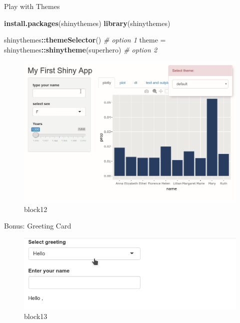 \documentclass[
  ignorenonframetext,
]{beamer}
\newenvironment{Shaded}{\begin{snugshade}}{\end{snugshade}}
\newcommand{\CommentTok}[1]{\textcolor[rgb]{0.56,0.35,0.01}{\textit{#1}}}
\newcommand{\KeywordTok}[1]{\textcolor[rgb]{0.13,0.29,0.53}{\textbf{#1}}}
\newcommand{\NormalTok}[1]{#1}
\newcommand{\OperatorTok}[1]{\textcolor[rgb]{0.81,0.36,0.00}{\textbf{#1}}}
\newcommand{\StringTok}[1]{\textcolor[rgb]{0.31,0.60,0.02}{#1}}
\begin{document}
\begin{frame}[fragile]{Play with Themes}
\protect\hypertarget{play-with-themes}{}

\begin{Shaded}
\begin{Highlighting}[]
\KeywordTok{install.packages}\NormalTok{(}\StringTok{\textquotesingle{}shinythemes\textquotesingle{}}\NormalTok{)}
\KeywordTok{library}\NormalTok{(}\StringTok{\textquotesingle{}shinythemes\textquotesingle{}}\NormalTok{)}
\end{Highlighting}
\end{Shaded}

\begin{Shaded}
\begin{Highlighting}[]
\NormalTok{  shinythemes}\OperatorTok{::}\KeywordTok{themeSelector}\NormalTok{()  }\CommentTok{\# option 1}
\NormalTok{  theme =}\StringTok{ }\NormalTok{shinythemes}\OperatorTok{::}\KeywordTok{shinytheme}\NormalTok{(}\StringTok{\textquotesingle{}superhero\textquotesingle{}}\NormalTok{)  }\CommentTok{\# option 2}
\end{Highlighting}
\end{Shaded}

\begin{figure}
\centering
\includegraphics{images/themes.gif}
\caption{block12}
\end{figure}

\end{frame}

\begin{frame}{Bonus: Greeting Card}
\protect\hypertarget{bonus-greeting-card}{}

\begin{figure}
\centering
\includegraphics{images/greeting.gif}
\caption{block13}
\end{figure}

\end{frame}
\end{document}
